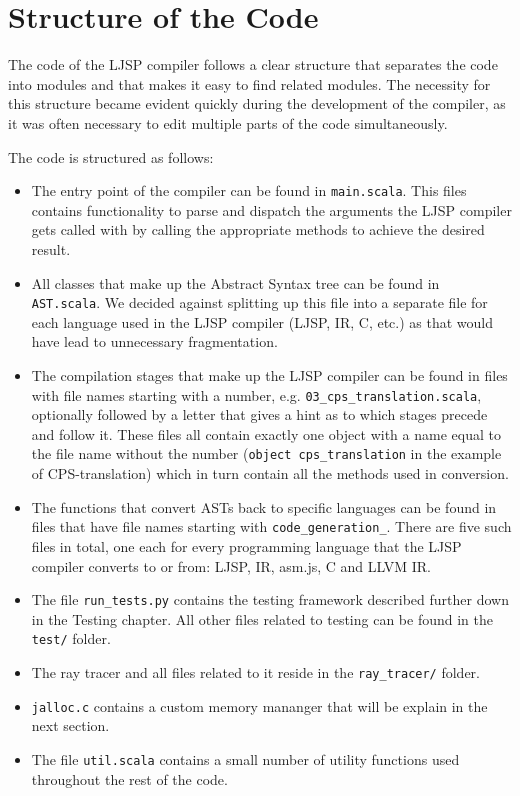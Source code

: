 \documentclass[11pt]{report}
\begin{document}
\section{Structure of the Code}
The code of the LJSP compiler follows a clear structure that separates the code into modules and that makes it easy to find related modules. The necessity for this structure became evident quickly during the development of the compiler, as it was often necessary to edit multiple parts of the code simultaneously.

The code is structured as follows:
\begin{itemize}
\item The entry point of the compiler can be found in \texttt{main.scala}. This files contains functionality to parse and dispatch the arguments the LJSP compiler gets called with by calling the appropriate methods to achieve the desired result.
\item All classes that make up the Abstract Syntax tree can be found in \texttt{AST.scala}. We decided against splitting up this file into a separate file for each language used in the LJSP compiler (LJSP, IR, C, etc.) as that would have lead to unnecessary fragmentation.
\item The compilation stages that make up the LJSP compiler can be found in files with file names starting with a number, e.g. \texttt{03_cps_translation.scala}, optionally followed by a letter that gives a hint as to which stages precede and follow it. These files all contain exactly one object with a name equal to the file name without the number (\texttt{object cps_translation} in the example of CPS-translation) which in turn contain all the methods used in conversion. 
\item The functions that convert ASTs back to specific languages can be found in files that have file names starting with \texttt{code_generation_}. There are five such files in total, one each for every programming language that the LJSP compiler converts to or from: LJSP, IR, asm.js, C and LLVM IR.
\item The file \texttt{run_tests.py} contains the testing framework described further down in the Testing chapter. All other files related to testing can be found in the \texttt{test/} folder.
\item The ray tracer and all files related to it reside in the \texttt{ray_tracer/} folder.
\item \texttt{jalloc.c} contains a custom memory mananger that will be explain in the next section.
\item The file \texttt{util.scala} contains a small number of utility functions used throughout the rest of the code.
\end{itemize}
\end{document}
